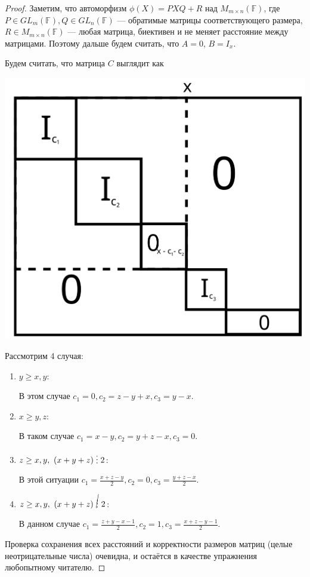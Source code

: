 \documentclass{article}
\newcommand{\divides}{\mathrel{\raisebox{-0.2ex}{\vdots}}}
\begin{document}
\begin{proof}
    Заметим, что автоморфизм $\phi(X) = PXQ + R$ над $M_{m \times n}(\mathbb{F})$, где $P \in GL_m(\mathbb{F}), Q \in GL_n(\mathbb{F})$ — обратимые матрицы соответствующего размера, $R \in M_{m \times n}(\mathbb{F})$ — любая матрица, биективен и не меняет расстояние между матрицами. Поэтому дальше будем считать, что $A = 0$, $B = I_x$. 
    
    Будем считать, что матрица $C$ выглядит как \\
\begin{center}
\includegraphics[scale=0.6]{matrix.png} \\
\end{center}
Рассмотрим 4 случая:
\begin{enumerate}
    \item $y \ge x, y$:

    В этом случае $c_1 = 0, c_2 = z-y+x, c_3 = y - x$.
    \item $x \ge y, z$:

    В таком случае $c_1=x - y,c_2 = y + z - x, c_3 = 0$.
    \item $z \ge x, y, \ (x + y + z) \divides 2$:

    В этой ситуации $c_1 = \frac{x + z - y}{2},c_2 = 0,c_3=\frac{y +z-x}{2}$.
    \item $z \ge x, y, \ (x + y + z) \ \cancel{\divides} \ 2$:

    В данном случае $c_1 = \frac{z + y - x - 1}{2},c_2 = 1, c_3 = \frac{x + z - y - 1}{2}$.

\end{enumerate}
Проверка сохранения всех расстояний и корректности размеров матриц (целые неотрицательные числа) очевидна, и остаётся в качестве упражнения любопытному читателю.
\end{proof}
\end{document}

